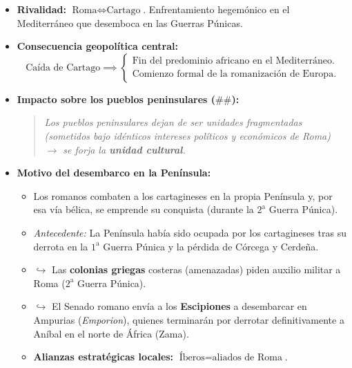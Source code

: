 \documentclass[11pt,letterpaper]{article}
\begin{document}
\begin{itemize}
  \item \textbf{Rivalidad:} $\text{Roma} \iff \text{Cartago}$. Enfrentamiento hegemónico en el Mediterráneo que desemboca en las Guerras Púnicas.
  \item \textbf{Consecuencia geopolítica central:}
  \[
    \text{Caída de Cartago} \implies \begin{cases}
      \text{Fin del predominio africano en el Mediterráneo.} \\
      \text{Comienzo formal de la romanización de Europa.}
    \end{cases}
  \]
  \item \textbf{Impacto sobre los pueblos peninsulares ($\#\#$):}
  \begin{quote}
    \itshape
    Los pueblos peninsulares dejan de ser unidades fragmentadas (sometidos bajo idénticos intereses políticos y económicos de Roma) $\longrightarrow$ se forja la \textbf{unidad cultural}.
  \end{quote}
  \item \textbf{Motivo del desembarco en la Península:}
  \begin{itemize}
    \item Los romanos combaten a los cartagineses en la propia Península y, por esa vía bélica, se emprende su conquista (durante la $2^{\text{a}}$ Guerra Púnica).
    \item \textit{Antecedente:} La Península había sido ocupada por los cartagineses tras su derrota en la $1^{\text{a}}$ Guerra Púnica y la pérdida de Córcega y Cerdeña.
    \item $\hookrightarrow$ Las \textbf{colonias griegas} costeras (amenazadas) piden auxilio militar a Roma ($2^{\text{a}}$ Guerra Púnica).
    \item $\hookrightarrow$ El Senado romano envía a los \textbf{Escipiones} a desembarcar en Ampurias (\textit{Emporion}), quienes terminarán por derrotar definitivamente a Aníbal en el norte de África (Zama).
    \item \textbf{Alianzas estratégicas locales:} $\text{Íberos} = \text{aliados de Roma}$.
  \end{itemize}
\end{itemize}
\end{document}
